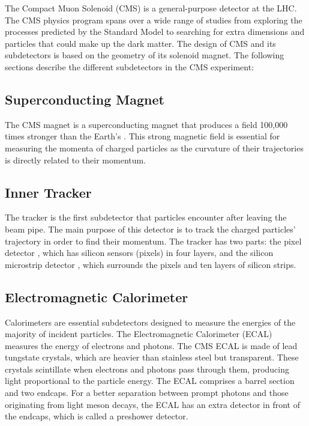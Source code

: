 The Compact Muon Solenoid (CMS)%
is a general-purpose detector at the LHC.
The CMS physics program spans over a wide range of studies from exploring the processes predicted by the Standard Model to searching for extra dimensions and particles that could make up the dark matter.
The design of CMS and its subdetectors is based on the geometry of its solenoid magnet.%
 The following sections describe the different subdetectors in the CMS experiment:

\subsection{Superconducting Magnet}
The CMS magnet is a superconducting magnet that produces a field 100,000 times stronger than the Earth's%
. This strong magnetic field is essential for measuring the momenta of charged particles as the curvature of their trajectories is directly related to their momentum.

\subsection{Inner Tracker}
The tracker is the first subdetector that particles encounter after leaving the beam pipe.
The main purpose of this detector is to track the charged particles' trajectory in order to find their momentum.
The tracker has two parts: the pixel detector%
, which has silicon sensors (pixels) in four layers, and the silicon microstrip detector%
, which surrounds the pixels and ten layers of silicon strips.

\subsection{Electromagnetic Calorimeter}
Calorimeters are essential subdetectors designed to measure the energies of the majority of incident particles.
The Electromagnetic Calorimeter (ECAL)%
 measures the energy of electrons and photons.
The CMS ECAL is made of lead tungstate crystals, which are heavier than stainless steel but transparent.
These crystals scintillate when electrons and photons pass through them, producing light proportional to the particle energy.
The ECAL comprises a barrel section and two endcaps.%
 For a better separation between prompt photons and those originating from light meson decays, the ECAL has an extra detector in front of the endcaps, which is called a preshower detector.

